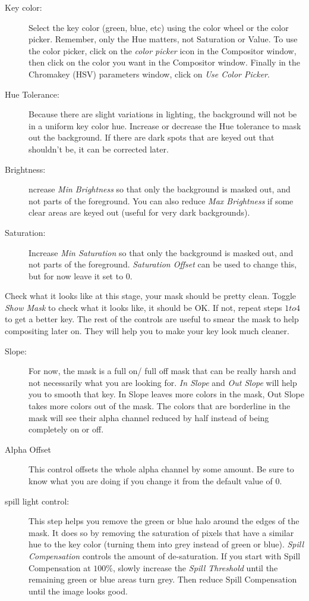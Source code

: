 \begin{description}
    \item[Key color:] Select the key color (green, blue, etc) using the color wheel or the color picker. Remember, only the Hue matters, not Saturation or Value. To use the color picker, click on the \textit{color picker} icon in the Compositor window, then click on the color you want in the Compositor window. Finally  in the Chromakey (HSV) parameters window, click on \textit{Use Color Picker}.
    \item[Hue Tolerance:] Because there are slight variations in lighting, the background will not be in a uniform key color hue. Increase or decrease the Hue tolerance to mask out the background. If there are dark spots that are keyed out that shouldn’t be, it can be corrected later.
    \item[Brightness:] ncrease \textit{Min Brightness} so that only the background is masked out, and not parts of the foreground. You can also reduce \textit{Max Brightness} if some clear areas are keyed out (useful for very dark backgrounds).
    \item[Saturation:] Increase \textit{Min Saturation} so that only the background is masked out, and not parts of the foreground. \textit{Saturation Offset} can be used to change this, but for now leave it set to $0$.
\end{description}

Check what it looks like at this stage, your mask should be pretty clean. Toggle \textit{Show Mask} to check what it looks like, it should be OK. If not, repeat steps $1 to 4$ to get a better key. The rest of the controls are useful to smear the mask to help compositing later on. They will help you to make your key look much cleaner.

\begin{description}
    \item[Slope:] For now, the mask is a full on/ full off mask that can be really harsh and not necessarily what you are looking for. \textit{In Slope} and \textit{Out Slope} will help you to smooth that key. In Slope leaves more colors in the mask, Out Slope takes more colors out of the mask. The colors that are borderline in the mask will see their alpha channel reduced by half instead of being completely on or off.
    \item[Alpha Offset] This control offsets the whole alpha channel by some amount. Be sure to know what you are doing if you change it from the default value of $0$.
    \item[spill light control:] This step helps you remove the green or blue halo around the edges of the mask. It does so by removing the saturation of pixels that have a similar hue to the key color (turning them into grey instead of green or blue). \textit{Spill Compensation} controls the amount of de-saturation. If you start with Spill Compensation at $100\%$, slowly increase the \textit{Spill Threshold} until the remaining green or blue areas turn grey. Then reduce Spill Compensation until the image looks good.
\end{description}

